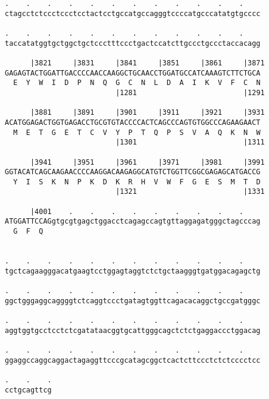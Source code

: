 \documentclass{article}
\begin{document}
\begin{Verbatim}
.    .    .    .    .    .    .    .    .    .    .    .    
ctagcctctccctccctcctactcctgccatgccagggtccccatgcccatatgtgcccc
                                                            
.    .    .    .    .    .    .    .    .    .    .    .    
taccatatggtgctggctgctccctttccctgactccatcttgccctgccctaccacagg
                                                            
      |3821     |3831     |3841     |3851     |3861     |3871
GAGAGTACTGGATTGACCCCAACCAAGGCTGCAACCTGGATGCCATCAAAGTCTTCTGCA
  E  Y  W  I  D  P  N  Q  G  C  N  L  D  A  I  K  V  F  C  N
                          |1281                         |1291
  
      |3881     |3891     |3901     |3911     |3921     |3931
ACATGGAGACTGGTGAGACCTGCGTGTACCCCACTCAGCCCAGTGTGGCCCAGAAGAACT
  M  E  T  G  E  T  C  V  Y  P  T  Q  P  S  V  A  Q  K  N  W
                          |1301                         |1311
  
      |3941     |3951     |3961     |3971     |3981     |3991
GGTACATCAGCAAGAACCCCAAGGACAAGAGGCATGTCTGGTTCGGCGAGAGCATGACCG
  Y  I  S  K  N  P  K  D  K  R  H  V  W  F  G  E  S  M  T  D
                          |1321                         |1331
  
      |4001    .    .    .    .    .    .    .    .    .    
ATGGATTCCAGgtgcgtgagctggacctcagagccagtgttaggagatgggctagcccag
  G  F  Q                                                   
                                                            
  
.    .    .    .    .    .    .    .    .    .    .    .    
tgctcagaagggacatgaagtcctggagtaggtctctgctaagggtgatggacagagctg
                                                            
.    .    .    .    .    .    .    .    .    .    .    .    
ggctgggaggcaggggtctcaggtccctgatagtggttcagacacaggctgccgatgggc
                                                            
.    .    .    .    .    .    .    .    .    .    .    .    
aggtggtgcctcctctcgatataacggtgcattgggcagctctctgaggaccctggacag
                                                            
.    .    .    .    .    .    .    .    .    .    .    .    
ggaggccaggcaggactagaggttcccgcatagcggctcactcttccctctctcccctcc
                                                            
.    .    .
cctgcagttcg
           
           
 

\end{Verbatim}
\end{document}
